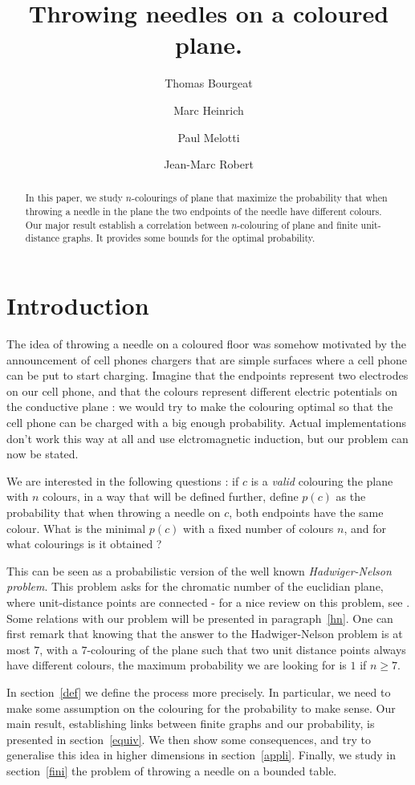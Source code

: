 \documentclass[a4paper,11pt]{article}
\title{Throwing needles on a coloured plane.}
\author{Thomas Bourgeat \and Marc Heinrich \and Paul Melotti 
\and Jean-Marc Robert}
\theoremstyle{definition}
\theoremstyle{remark}
\begin{document}
\maketitle

\begin{abstract}  In this paper, we study $n$-colourings of plane 
that maximize the probability that when throwing a needle in the plane the two 
endpoints of the needle have different colours. Our major result establish a 
correlation between $n$-colouring of plane and finite unit-distance graphs. 
It provides some bounds for the optimal probability.\end{abstract}

\section{Introduction}
The idea of throwing a needle on a coloured floor was somehow motivated by 
the announcement of cell phones chargers that are simple surfaces where a cell 
phone can be put to start charging. Imagine that the endpoints 
represent two electrodes on our cell phone, and that the colours represent 
different electric potentials on the conductive plane : we would try to make 
the colouring optimal so that the cell phone can be charged with a big enough 
probability. Actual implementations don't work this way at all and use 
elctromagnetic induction, but our problem can now be stated.

We are interested in the following questions : if $c$ is a 
\emph{valid} colouring the plane with $n$ colours, in a  way that will be 
defined further, define $p(c)$ as the probability that when throwing a needle 
on $c$, both endpoints have the same colour. What is the minimal $p(c)$ with a 
fixed number of colours $n$, and for what colourings is it obtained ?

This can be seen as a probabilistic version of the well known 
\emph{Hadwiger-Nelson problem}. This problem asks for the chromatic number 
of the euclidian plane, where unit-distance points are connected - for 
a nice review on this problem, see \cite{hadwiger}. Some 
relations with our problem will be presented in paragraph~\ref{hn}. One can 
first remark that knowing that the answer to the Hadwiger-Nelson problem is at 
most $7$, with a $7$-colouring of the plane such that two unit distance points 
always have different colours, the maximum probability we are looking for is 
$1$ if $n \geq 7$.

In section~\ref{def} we define the process more precisely. In particular, we 
need to make some assumption on the colouring for the probability to make 
sense. Our main result, establishing links between finite graphs and our 
probability, is presented in section~\ref{equiv}. We then show some 
consequences, and try to generalise this idea in higher dimensions in
section~\ref{appli}. Finally, we study in section~\ref{fini} the problem of 
throwing a needle on a bounded table.
\end{document}
